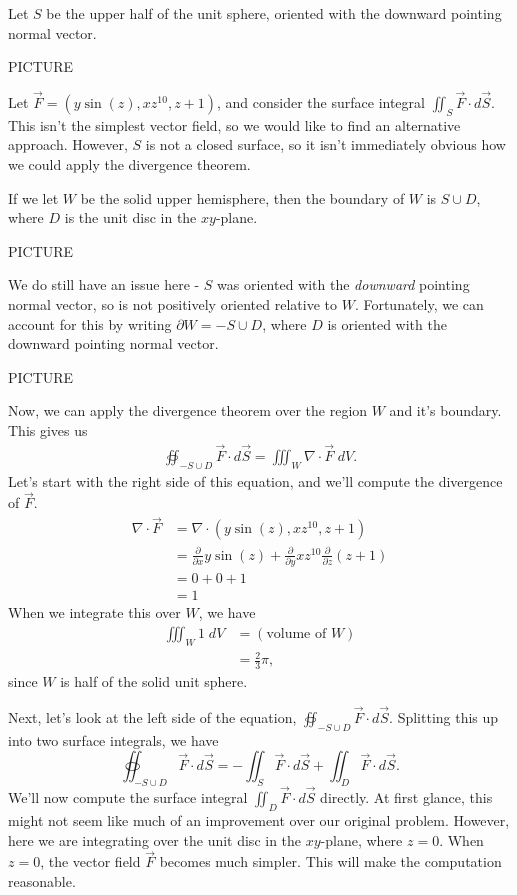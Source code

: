 \documentclass{ximera}
\begin{document}
\begin{example}
Let $S$ be the upper half of the unit sphere, oriented with the downward pointing normal vector.

PICTURE

Let $\vec{F} = \left(y\sin(z), xz^10, z+1\right)$, and consider the surface integral $\iint_S\vec{F}\cdot d\vec{S}$. This isn't the simplest vector field, so we would like to find an alternative approach. However, $S$ is not a closed surface, so it isn't immediately obvious how we could apply the divergence theorem.

If we let $W$ be the solid upper hemisphere, then the boundary of $W$ is $S\cup D$, where $D$ is the unit disc in the $xy$-plane.

PICTURE

We do still have an issue here - $S$ was oriented with the \emph{downward} pointing normal vector, so is not positively oriented relative to $W$. Fortunately, we can account for this by writing $\partial W = -S\cup D$, where $D$ is oriented with the downward pointing normal vector.

PICTURE

Now, we can apply the divergence theorem over the region $W$ and it's boundary. This gives us
\begin{align*}
\oiint_{-S\cup D} \vec{F}\cdot d\vec{S} = \iiint_W \nabla\cdot \vec{F}\;dV.
\end{align*}
Let's start with the right side of this equation, and we'll compute the divergence of $\vec{F}$.
\begin{align*}
\nabla\cdot \vec{F} &= \nabla \cdot \left(y\sin(z), xz^10, z+1\right)\\
&= \frac{\partial}{\partial x}y\sin(z) + \frac{\partial}{\partial y}xz^10 \frac{\partial}{\partial z} (z+1)\\
&= 0+0+1\\
&= 1
\end{align*}
When we integrate this over $W$, we have
\begin{align*}
\iiint_W 1\;dV &= (\text{volume of }W)\\
&= \frac{2}{3}\pi,
\end{align*}
since $W$ is half of the solid unit sphere.

Next, let's look at the left side of the equation, $\oiint_{-S\cup D} \vec{F}\cdot d\vec{S}$. Splitting this up into two surface integrals, we have
\[
\oiint_{-S\cup D} \vec{F}\cdot d\vec{S} = -\iint_S\vec{F}\cdot d\vec{S} + \iint_D\vec{F}\cdot d\vec{S}.
\]
We'll now compute the surface integral $\iint_D\vec{F}\cdot d\vec{S}$ directly. At first glance, this might not seem like much of an improvement over our original problem. However, here we are integrating over the unit disc in the $xy$-plane, where $z=0$. When $z=0$, the vector field $\vec{F}$ becomes much simpler. This will make the computation reasonable.


\end{example}
\end{document}
